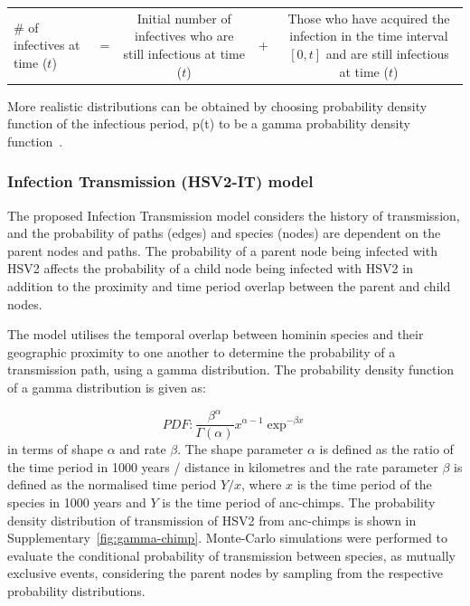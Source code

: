 \documentclass[fleqn,10pt]{wlscirep}
\begin{document}
\begin{table}[!h]
	\centering
	\renewcommand{\arraystretch}{1.5}
	\begin{tabulary}{\linewidth}{LCCCC}
		\# of infectives at time ($t$) & =  & 
		Initial number of infectives who are still infectious at time ($t$) & + & 
		Those who have acquired the infection in the time interval $[0, t]$ and are still infectious at time ($t$)			\\ 
	\end{tabulary}
\end{table}

More realistic distributions can be obtained by choosing  probability density function of the infectious period,  p(t) to be a gamma probability density function~\citep{Blythe1988,Lloyd2001}.

\subsubsection*{Infection Transmission (HSV2-IT) model}
The proposed Infection Transmission model considers the history of transmission, and the probability of paths (edges) and species (nodes) are dependent on the parent nodes and paths. The probability of a parent node being infected with HSV2 affects the probability of a child node being infected with HSV2 in addition to the proximity and time period overlap between the parent and child nodes. 

The model utilises the temporal overlap between hominin species and their geographic proximity to one another to determine the probability of a transmission path, using a gamma distribution.  The probability density function of a gamma distribution is given as:

\begin{equation}
PDF:\frac{\beta^\alpha}{\Gamma(\alpha)}x^{\alpha - 1} \exp^{-\beta x}
\end{equation}
in terms of shape $\alpha$ and rate $\beta$. The shape parameter $\alpha$ is defined as the ratio of the time period in 1000 years / distance in kilometres and the rate parameter $\beta$ is defined as the normalised time period $Y / x$, where $x$ is the time period of the species in 1000 years and $Y$ is the time period of anc-chimps. The probability density distribution of transmission of HSV2 from anc-chimps is shown in Supplementary~\cref{fig:gamma-chimp}. Monte-Carlo simulations were performed to evaluate the conditional probability of transmission between species, as mutually exclusive events, considering the parent nodes by sampling from the respective probability distributions. 
\end{document}
